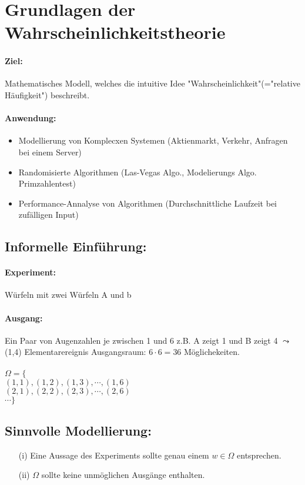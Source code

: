 \documentclass{article}
\begin{document}
\section*{Grundlagen der Wahrscheinlichkeitstheorie}

\paragraph*{Ziel:} Mathematisches Modell, welches die intuitive Idee "Wahrscheinlichkeit"(="relative Häufigkeit") beschreibt.
\paragraph*{Anwendung:} 
\begin{itemize}
    \item Modellierung von Komplecxen Systemen (Aktienmarkt, Verkehr, Anfragen bei einem Server)
    \item Randomisierte Algorithmen (Las-Vegas Algo., Modelierungs Algo. Primzahlentest)
    \item Performance-Annalyse von Algorithmen (Durchschnittliche Laufzeit bei zufälligen Input)
\end{itemize}

\subsection*{Informelle Einführung:}
\paragraph*{Experiment:} Würfeln mit zwei Würfeln A und b
\paragraph*{Ausgang:} Ein Paar von Augenzahlen je zwischen 1 und 6 z.B. A zeigt 1 und B zeigt 4 \(\leadsto\) (1,4) Elementarereignis
Ausgangsraum: \(6 \cdot 6 = 36\) Möglichekeiten.\\
\\ \(\Omega = \{\) 
\\ \((1,1), (1,2), (1,3), \cdots, (1,6)\)
\\ \((2,1), (2,2), (2,3), \cdots, (2,6)\)
\\ \(\cdots\}\)

\subsection*{Sinnvolle Modellierung: }
\begin{itemize}
    \item[(i)] Eine Aussage des Experiments sollte genau einem \(w \in \Omega\) entsprechen.
    \item[(ii)] \(\Omega\) sollte keine unmöglichen Ausgänge enthalten.
\end{itemize}
\end{document}
